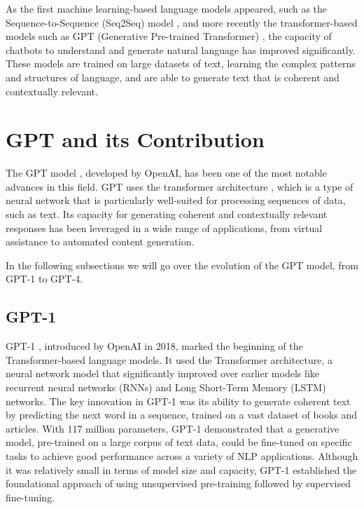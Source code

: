 \documentclass[a4paper,12pt,twoside]{ThesisStyle}
\begin{document}
As the first machine learning-based language models appeared, such as the Sequence-to-Sequence (Seq2Seq) model \cite{Sutskever2014SequenceSequenceLearningNeural}, and more recently the transformer-based models such as GPT (Generative Pre-trained Transformer) \cite{Vaswani2023AttentionNeed, Radford2018GPT1}, the capacity of chatbots to understand and generate natural language has improved significantly. These models are trained on large datasets of text, learning the complex patterns and structures of language, and are able to generate text that is coherent and contextually relevant.

\section{GPT and its Contribution}
\label{sec:gpt}

The GPT model \cite{Radford2018GPT1}, developed by OpenAI, has been one of the most notable advances in this field. GPT uses the transformer architecture \cite{Vaswani2023AttentionNeed}, which is a type of neural network that is particularly well-suited for processing sequences of data, such as text. Its capacity for generating coherent and contextually relevant responses has been leveraged in a wide range of applications, from virtual assistance to automated content generation.

In the following subsections we will go over the evolution of the GPT model, from GPT-1 to GPT-4.

\subsection{GPT-1}
\label{subsec:gpt-1}

GPT-1 \cite{Radford2018GPT1}, introduced by OpenAI in 2018, marked the beginning of the Transformer-based language models. It used the Transformer architecture, a neural network model that significantly improved over earlier models like recurrent neural networks (RNNs) and Long Short-Term Memory (LSTM) networks. The key innovation in GPT-1 was its ability to generate coherent text by predicting the next word in a sequence, trained on a vast dataset of books and articles. With 117 million parameters, GPT-1 demonstrated that a generative model, pre-trained on a large corpus of text data, could be fine-tuned on specific tasks to achieve good performance across a variety of NLP applications. Although it was relatively small in terms of model size and capacity, GPT-1 established the foundational approach of using unsupervised pre-training followed by supervised fine-tuning.
\end{document}

